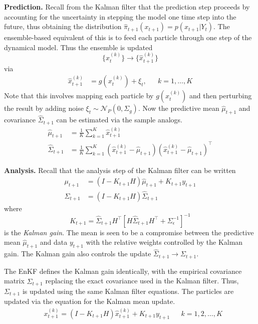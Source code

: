 \documentclass[12pt]{article}
\begin{document}
\bigskip
\noindent
\textbf{Prediction.} Recall from the Kalman filter that the prediction step proceeds by accounting for the uncertainty in stepping the model one time step into 
the future, thus obtaining the distribution $\hat{\pi}_{t+1}(x_{t+1}) = p(x_{t+1}|Y_t)$. The ensemble-based equivalent of this is to feed each particle through one 
step of the dynamical model. Thus the ensemble is updated 
\[\{x_t^{(k)}\} \to \{\hat{x}_{t+1}^{(k)}\}\]
via 
\begin{align*}
\hat{x}_{t+1}^{(k)} &= g(x_t^{(k)}) + \xi_t,  &&k = 1, \dots, K
\end{align*}
Note that this involves mapping each particle by $g(x_t^{(k)})$ and then perturbing the result by adding noise $\xi_t \sim \mathcal{N}_P(0, \Sigma_g)$. Now 
the predictive mean $\hat{\mu}_{t+1}$ and covariance $\hat{\Sigma}_{t+1}$ can be estimated via the sample analogs. 
\begin{align*}
\hat{\mu}_{t+1} &= \frac{1}{K} \sum_{k = 1}^{K} \hat{x}_{t+1}^{(k)} \\
\hat{\Sigma}_{t+1} &= \frac{1}{K} \sum_{k = 1}^{K} \left(\hat{x}_{t+1}^{(k)} - \hat{\mu}_{t+1} \right) \left(\hat{x}_{t+1}^{(k)} - \hat{\mu}_{t+1} \right)^\top
\end{align*}

\bigskip
\noindent
\textbf{Analysis.} Recall that the analysis step of the Kalman filter can be written 
\begin{align*}
\mu_{t+1} &= (I - K_{t+1}H) \hat{\mu}_{t+1} + K_{t+1} y_{t+1} \\
\Sigma_{t+1} &= (I - K_{t+1}H) \hat{\Sigma}_{t+1}
\end{align*}
where 
\[K_{t+1} = \hat{\Sigma}_{t+1} H^\top \left[H \hat{\Sigma}_{t+1}H^\top + \Sigma_{\epsilon}^{-1}   \right]^{-1} \]
is the \textit{Kalman gain}. The mean is seen to be a compromise between the predictive mean $\hat{\mu}_{t+1}$ and data 
$y_{t+1}$ with the relative weights controlled by the Kalman gain. The Kalman gain also controls the update 
$\hat{\Sigma}_{t+1} \to \Sigma_{t+1}$.  

The EnKF defines the Kalman gain identically, with the empirical covariance matrix $\hat{\Sigma}_{t+1}$ replacing the exact covariance used in the Kalman 
filter. Thus, $\Sigma_{t+1}$ is updated using the same Kalman filter equations. The particles are updated via the equation for the Kalman mean update. 
\begin{align}
&x^{(k)}_{t+1} = (I - K_{t+1}H) \hat{x}^{(k)}_{t+1} + K_{t+1} y_{t+1} && k = 1, 2, \dots, K \label{EnKF_analysis_update}
\end{align}
\end{document}
